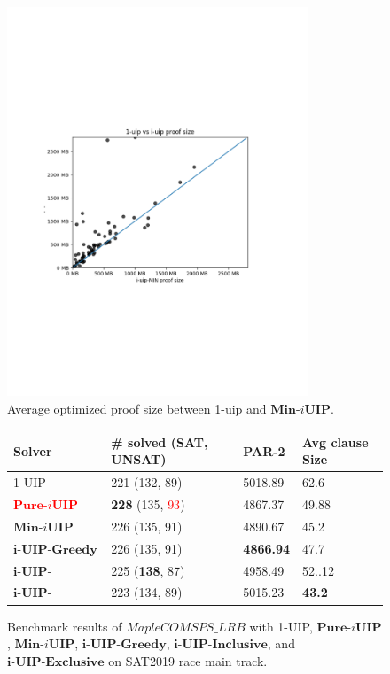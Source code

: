 \documentclass[runningheads]{llncs}
\newcommand{\IUIPPURE}{\textbf{Pure-$i$UIP}}
\newcommand{\IUIPMIN}{\textbf{Min-$i$UIP}}
\newcommand{\IUIPGreedy}{\textbf{i-UIP-Greedy}}
\newcommand{\IUIPActive}{\textbf{i-UIP-Inclusive}}
\newcommand{\IUIPDist}{\textbf{i-UIP-Exclusive}}
\newcommand{\MapleBase}{\textit{MapleCOMSPS\_LRB}}
\newcommand{\nf}[1]{\textcolor{red}{#1}}
\begin{document}
\begin{figure}
    \centering
    \includegraphics[width=0.8\textwidth]{figures/proof_size_compare.pdf}
    \caption{Average optimized proof size between 1-uip and $\IUIPMIN$.}
    \label{fig:proof_compare}
\end{figure}


\begin{figure} 
\begin{center}
\begin{tabular}{ | m{3.5cm} | m{4cm}| m{2cm} | m{2.75cm} |  } 
\hline
Solver & \# solved (SAT, UNSAT) & PAR-2 & Avg clause Size \\ 
\hline
1-UIP & 221 (132, 89)  & 5018.89 & 62.6  \\ 
\hline
\nf{$\IUIPPURE$} &\textbf{228} (135, \nf{93}) & 4867.37 & 49.88 \\
\hline
$\IUIPMIN$ & 226 (135, 91) & 4890.67 & 45.2 \\ 
\hline
$\IUIPGreedy$ & 226 (135, 91)  & \textbf{4866.94} & 47.7 \\
\hline
$\IUIPActive$ & 225 (\textbf{138}, 87) & 4958.49 & 52..12 \\
\hline
$\IUIPDist$ & 223 (134, 89) & 5015.23 & \textbf{43.2} \\
\hline
\end{tabular}
\end{center}
\caption{Benchmark results of $\MapleBase$ with 1-UIP, $\IUIPPURE$, $\IUIPMIN$, $\IUIPGreedy$,
$\IUIPActive$, and $\IUIPDist$ on SAT2019 race main track.}
\label{fig:t4}
\end{figure}
\end{document}
